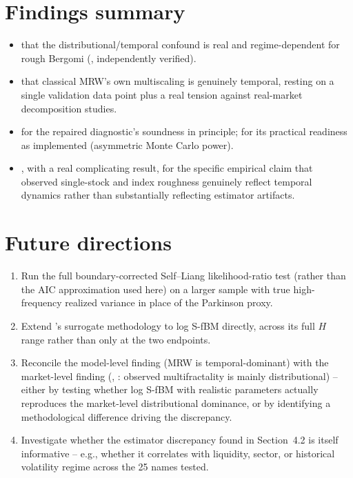 \documentclass[11pt]{article}
\begin{document}
\section{Findings summary}

\begin{itemize}
\item {} that the distributional/temporal confound is real and regime-dependent for rough Bergomi (\citealp{brandi2026multiscaling}, independently verified).
\item {} that classical MRW's own multiscaling is genuinely temporal, resting on a single validation data point plus a real tension against real-market decomposition studies.
\item {} for the repaired diagnostic's soundness in principle;  for its practical readiness as implemented (asymmetric Monte Carlo power).
\item {}, with a real complicating result, for the specific empirical claim that observed single-stock and index roughness genuinely reflect temporal dynamics rather than substantially reflecting estimator artifacts.
\end{itemize}


\section{Future directions}

\begin{enumerate}
\item Run the full boundary-corrected Self--Liang likelihood-ratio test (rather than the AIC approximation used here) on a larger sample with true high-frequency realized variance in place of the Parkinson proxy.
\item Extend \citet{brandi2026multiscaling}'s surrogate methodology to log S-fBM directly, across its full $H$ range rather than only at the two endpoints.
\item Reconcile the model-level finding (MRW is temporal-dominant) with the market-level finding (\citealp{zhou2009finite}, \citealp{jiang2012understanding}: observed multifractality is mainly distributional) -- either by testing whether log S-fBM with realistic parameters actually reproduces the market-level distributional dominance, or by identifying a methodological difference driving the discrepancy.
\item Investigate whether the estimator discrepancy found in Section~4.2 is itself informative -- e.g., whether it correlates with liquidity, sector, or historical volatility regime across the 25 names tested.
\end{enumerate}
\end{document}
